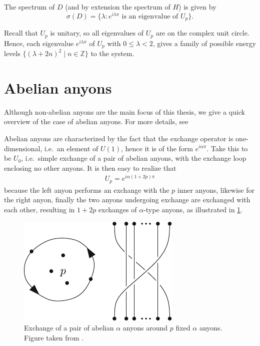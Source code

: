 \begin{lemma}\label{D spectrum}
  The spectrum of $D$ (and by extension the spectrum of $H$) is given by
  \begin{equation}
    σ(D) = \big\{λ : e^{iλπ} \text{ is an eigenvalue of } U_p\big\}.
  \end{equation}
\end{lemma}

\begin{remark}
  Recall that $U_p$ is unitary, so all eigenvalues of $U_p$ are on the complex unit circle. Hence, each eigenvalue $e^{iλπ}$ of $U_p$ with $0 \le λ < 2$, gives a family of possible energy levels $\big\{(λ + 2n)^2 \mid n \in \mathbb{Z}\big\}$ to the system.
\end{remark}





\section{Abelian anyons}\label{sec:statistical repulsion abelian ayons}

Although non-abelian anyons are the main focus of this thesis, we give a quick overview of the case of abelian anyons. For more details, see \cite{lundholm-solovej}

Abelian anyons are characterized by the fact that the exchange operator is one-dimensional, i.e.\ an element of $U(1)$, hence it is of the form $e^{i\alpha\pi}$. Take this to be $U_0$, i.e.\ simple exchange of a pair of abelian anyons, with the exchange loop enclosing no other anyons. It is then easy to realize that
\begin{align}\label{eq:abelian Up}
  U_p = e^{iα(1+2p)π}
\end{align}
because the left anyon performs an exchange with the $p$ inner anyons, likewise for the right anyon, finally the two anyons undergoing exchange are exchanged with each other, resulting in $1+2p$ exchanges of $α$-type anyons, as illustrated in \cref{fig:abelian Up}.

\begin{figure}[h]
  \centering
  \includegraphics{img/interchange_loop_p.pdf}
  \caption{Exchange of a pair of abelian $α$ anyons around $p$ fixed $α$ anyons. Figure taken from \cite{lundholm-solovej}.}
  \label{fig:abelian Up}
\end{figure}


